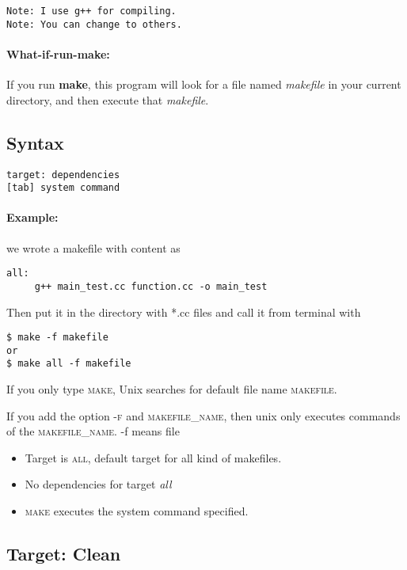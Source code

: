 \documentclass[10pt,a4paper,draft,onecolumn]{article}
\begin{document}
\begin{verbatim}
Note: I use g++ for compiling.
Note: You can change to others.
\end{verbatim}

\paragraph{What-if-run-make:} If you run \textbf{make}, this program will look for a file named \textit{makefile} in your current directory, and then execute that \textit{makefile}.

\subsection{Syntax}
\label{sec_syntax}

\begin{verbatim}
target: dependencies
[tab] system command
\end{verbatim}

\paragraph{Example:} we wrote a makefile with content as

\begin{verbatim}
all: 
     g++ main_test.cc function.cc -o main_test
\end{verbatim}

Then put it in the directory with *.cc files and call it from terminal with

\begin{verbatim}
$ make -f makefile
or
$ make all -f makefile
\end{verbatim}

If you only type \textsc{make}, Unix searches for default file name \textsc{makefile}.

If you add the option \textsc{-f} and \textsc{makefile\_name}, then unix only executes commands of the \textsc{makefile\_name}. \textsf{-f} means file

\begin{itemize}
\item Target is \textsc{all}, default target for all kind of makefiles.
\item No dependencies for target \textit{all}
\item \textsc{make} executes the system command specified.
\end{itemize}

\subsection{Target: Clean}
\end{document}
